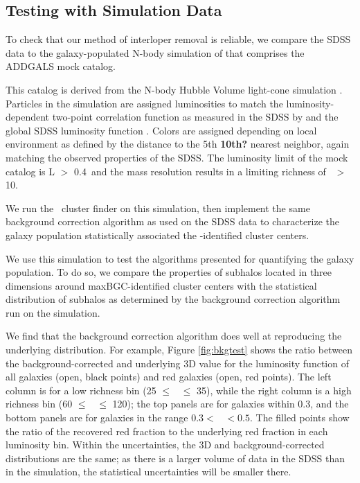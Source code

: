 \documentclass{emulateapj}
\begin{document}
\subsection{Testing with Simulation Data} \label{sec:bkgtest}
To check that our method of interloper removal is reliable, we compare the SDSS data to the galaxy-populated N-body simulation of \citet{Wechsler} that comprises the ADDGALS mock catalog. 


This catalog is derived from the N-body Hubble Volume light-cone
simulation \citep{Evrard02}. Particles in the simulation are assigned luminosities to
match the luminosity-dependent two-point correlation function as measured
in the SDSS by \citet{Zehavi04} and the global SDSS luminosity
function \citep{Blanton03}. Colors are assigned depending on local
environment as defined by the distance to the 5th {\bf 10th?} nearest
neighbor, again matching the observed properties of the SDSS. The luminosity limit of the mock catalog is L $>$ 0.4\Lstar\ and the mass resolution results in a limiting richness of \Ntwo\ $>$ 10.  


We run the \maxbcg\ cluster finder on this simulation, then implement
the same background correction algorithm as used on the SDSS data to characterize the galaxy
population statistically associated the \maxbcg-identified cluster
centers.

We use this simulation to test the algorithms presented for
quantifying the galaxy population. To do so, we compare the properties of subhalos located in
three dimensions around maxBGC-identified cluster centers with the statistical distribution
of subhalos as determined by the background correction algorithm run
on the simulation.




 We find that the
background correction algorithm does well at reproducing the
underlying distribution. For example, Figure \ref{fig:bkgtest} shows
the ratio between the background-corrected and underlying 3D value
for the luminosity function of all galaxies (open, black points) and red galaxies (open, red points). The left column is for a low richness bin (25 $\le$ \Ntwo\ $\le$ 35), while the
right column is a high richness bin (60 $\le$ \Ntwo\ $\le$ 120); the top panels are for
galaxies within 0.3\rtwo, and the bottom panels are for galaxies in
the range $0.3 <$ \rad\ $< 0.5$. The filled points show the ratio of
the recovered red fraction to the underlying red fraction in each
luminosity bin. Within the uncertainties, the 3D and background-corrected distributions are
the same; as there is a larger volume of data in the SDSS than in the
simulation, the statistical uncertainties will be smaller there.
\end{document}
